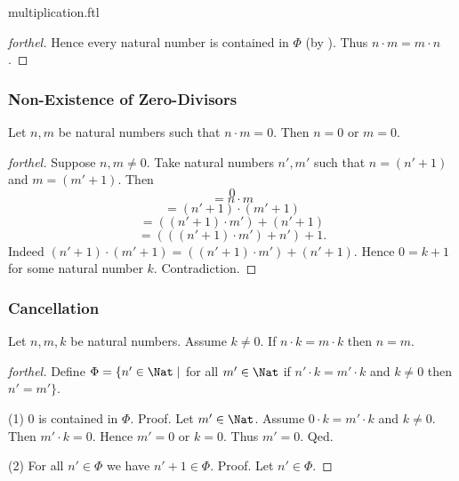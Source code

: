 \documentclass{naproche-library}
\begin{document}
\begin{smodule}{multiplication.ftl}
\begin{proof}[forthel]
    Hence every natural number is contained in $\Phi$ (by ).
    Thus $n \cdot m = m \cdot n$.
  \end{proof}


  \subsubsection*{Non-Existence of Zero-Divisors}

  \begin{proposition}[forthel,id=ARITHMETIC_06_3843962875936768]
    Let $n, m$ be natural numbers such that $n \cdot m = 0$.
    Then $n = 0$ or $m = 0$.
  \end{proposition}
  \begin{proof}[forthel]
    Suppose $n, m \neq 0$.
    Take natural numbers $n', m'$ such that $n = (n' + 1)$ and $m = (m' + 1)$.
    Then
    \[  0                                     \]
    \[    = n \cdot m                         \]
    \[    = (n' + 1) \cdot (m' + 1)           \]
    \[    = ((n' + 1) \cdot m') + (n' + 1)    \]
    \[    = (((n' + 1) \cdot m') + n') + 1.   \]
    Indeed $(n' + 1) \cdot (m' + 1) = ((n' + 1) \cdot m') + (n' + 1)$.
    Hence $0 = k + 1$ for some natural number $k$.
    Contradiction.
  \end{proof}


  \subsubsection*{Cancellation}

  \begin{proposition}[forthel,id=ARITHMETIC_06_31055184658432]
    Let $n, m, k$ be natural numbers.
    Assume $k \neq 0$.
    If $n \cdot k = m \cdot k$ then $n = m$.
  \end{proposition}
  \begin{proof}[forthel]
    Define $\Phi = \{ n' \in \Nat \mid$ for all $m' \in \Nat$ if $n' \cdot k = m' \cdot k$ and $k \neq 0$ then $n' = m' \}$.

    (1) $0$ is contained in $\Phi$. \newline
    Proof.
      Let $m' \in \Nat$.
      Assume $0 \cdot k = m' \cdot k$ and $k \neq 0$.
      Then $m' \cdot k = 0$.
      Hence $m' = 0$ or $k = 0$.
      Thus $m' = 0$.
    Qed.

    (2) For all $n' \in \Phi$ we have $n' + 1 \in \Phi$. \newline
    Proof.
      Let $n' \in \Phi$.


\end{proof}
\end{smodule}
\end{document}
